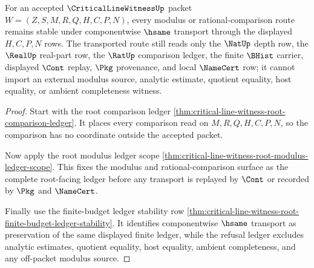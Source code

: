\begin{theorem}
\label{thm:critical-line-witness-modulus-comparison-transport-stability}
For an accepted $\CriticalLineWitnessUp$ packet
$W=(Z,S,M,R,Q,H,C,P,N)$, every modulus or rational-comparison route remains
stable under componentwise $\hsame$ transport through the displayed
$H,C,P,N$ rows. The transported route still reads only the $\NatUp$ depth row,
the $\RealUp$ real-part row, the $\RatUp$ comparison ledger, the finite
$\BHist$ carrier, displayed $\Cont$ replay, $\Pkg$ provenance, and local
$\NameCert$ row; it cannot import an external modulus source, analytic
estimate, quotient equality, host equality, or ambient completeness witness.
\end{theorem}
\begin{proof}
Start with the root comparison ledger
\autoref{thm:critical-line-witness-root-comparison-ledger}. It places every
comparison read on $M,R,Q,H,C,P,N$, so the comparison has no coordinate outside
the accepted packet.

Now apply the root modulus ledger scope
\autoref{thm:critical-line-witness-root-modulus-ledger-scope}. This fixes the
modulus and rational-comparison surface as the complete root-facing ledger
before any transport is replayed by $\Cont$ or recorded by $\Pkg$ and
$\NameCert$.

Finally use the finite-budget ledger stability row
\autoref{thm:critical-line-witness-root-finite-budget-ledger-stability}. It
identifies componentwise $\hsame$ transport as preservation of the same
displayed finite ledger, while the refusal ledger excludes analytic estimates,
quotient equality, host equality, ambient completeness, and any off-packet
modulus source.
\end{proof}

